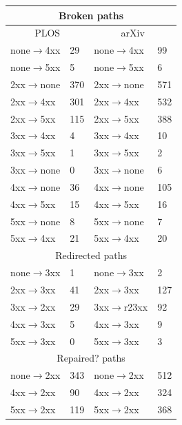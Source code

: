 \documentclass[12pt]{article}
\begin{document}
\begin{center}
  \begin{tabular}{|p{3cm}|p{3cm}|p{3cm}|p{3cm}|}
  \hline
  \multicolumn{4}{|c|}{Broken paths} \\
  \hline
  \multicolumn{2}{|c|}{PLOS} & \multicolumn{2}{|c|}{arXiv} \\
  \hline
  none$\rightarrow$4xx & 29 & none$\rightarrow$4xx & 99 \\
  \hline
  none$\rightarrow$5xx & 5 & none$\rightarrow$5xx & 6 \\
  \hline
  2xx$\rightarrow$none & 370 & 2xx$\rightarrow$none & 571 \\
  \hline
  2xx$\rightarrow$4xx & 301 & 2xx$\rightarrow$4xx & 532 \\
  \hline
  2xx$\rightarrow$5xx & 115 & 2xx$\rightarrow$5xx & 388 \\
  \hline
  3xx$\rightarrow$4xx & 4 & 3xx$\rightarrow$4xx & 10 \\
  \hline
  3xx$\rightarrow$5xx & 1 & 3xx$\rightarrow$5xx & 2 \\
  \hline
  3xx$\rightarrow$none & 0 & 3xx$\rightarrow$none & 6 \\
  \hline
  4xx$\rightarrow$none & 36 & 4xx$\rightarrow$none & 105 \\
  \hline
  4xx$\rightarrow$5xx & 15 & 4xx$\rightarrow$5xx & 16 \\
  \hline
  5xx$\rightarrow$none & 8 & 5xx$\rightarrow$none & 7 \\
  \hline
  5xx$\rightarrow$4xx & 21 & 5xx$\rightarrow$4xx & 20 \\
  \hline
  \multicolumn{4}{|c|}{Redirected paths} \\
  \hline
  none$\rightarrow$3xx & 1 & none$\rightarrow$3xx & 2 \\
  \hline
  2xx$\rightarrow$3xx & 41 & 2xx$\rightarrow$3xx & 127 \\
  \hline
  3xx$\rightarrow$2xx & 29 & 3xx$\rightarrow$r23xx & 92 \\
  \hline
  4xx$\rightarrow$3xx & 5 & 4xx$\rightarrow$3xx & 9 \\
  \hline
  5xx$\rightarrow$3xx & 0 & 5xx$\rightarrow$3xx & 3 \\
  \hline
  \multicolumn{4}{|c|}{Repaired? paths} \\
  \hline
  none$\rightarrow$2xx & 343 & none$\rightarrow$2xx & 512 \\
  \hline
  4xx$\rightarrow$2xx & 90 & 4xx$\rightarrow$2xx & 324 \\
  \hline
  5xx$\rightarrow$2xx & 119 & 5xx$\rightarrow$2xx & 368 \\
  \hline

  \end{tabular}
\end{center}
\end{document}

